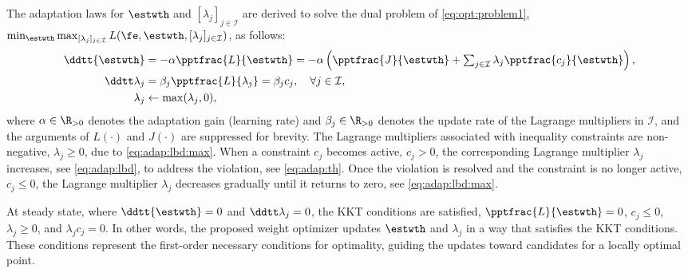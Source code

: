 \documentclass[letterpaper, journal]{IEEEtran}
\newcommand{\ctxt}[2]{\color{#1}#2\color{black}}
\begin{document}
The adaptation laws for $\estwth$ and $[\lambda_j]_{j\in\mathcal I}$ are derived to solve the dual problem of \eqref{eq:opt:problem1}, \ie $\min_{\estwth} \max_{[\lambda_j]_{j\in\mathcal I}}L(\fe,\estwth,[\lambda_j]_{j\in\mathcal I})$, as follows:
\begin{subequations}
    \begin{align}
            \ddtt{\estwth}
            &
            =
            -\alpha \pptfrac{L}{\estwth}
            =
            -\alpha 
            \left(
                \pptfrac{J}{\estwth}
                +
                \textstyle\sum_{j\in\mathcal{I}}
                \lambda_j 
                \pptfrac{c_j}{\estwth}
            \right),
        \label{eq:adap:th}
            \\
            \ddtt\lambda_j
            & 
            = 
            \beta_j\pptfrac{L}{\lambda_j} 
            = 
            \beta_j c_j ,
            \quad \forall j\in\mathcal I,
        \label{eq:adap:lbd}
            \\
            \lambda_j & \leftarrow \max(\lambda_j,0) ,
        \label{eq:adap:lbd:max}
    \end{align}
    \label{eq:adaptation law}%
\end{subequations}
where $\alpha\in\R_{>0}$ denotes the adaptation gain (learning rate) and $\beta_j\in\R_{>0}$ denotes the update rate of the Lagrange multipliers in $\mathcal I$, and the arguments of $L(\cdot)$ and $J(\cdot)$ are suppressed for brevity. 
The Lagrange multipliers associated with inequality constraints are non-negative, \ie $\lambda_j\ge 0$, due to \eqref{eq:adap:lbd:max}. 
When a constraint $c_j$ becomes active, \ie $c_j > 0$, the corresponding Lagrange multiplier $\lambda_j$ increases, see \eqref{eq:adap:lbd}, to address the violation, see \eqref{eq:adap:th}.
Once the violation is resolved and the constraint is no longer active, \ie $c_j \le 0$, the Lagrange multiplier $\lambda_j$ decreases gradually until it returns to zero, see \eqref{eq:adap:lbd:max}.

At steady state, where $\ddtt{\estwth}=0$ and $\ddtt\lambda_j=0$, the KKT conditions are satisfied, \ie $\pptfrac{L}{\estwth}=0$, $c_j \le 0$, $\lambda_j \ge 0$, and $\lambda_j c_j=0$.
In other words, the proposed weight optimizer updates $\estwth$ and $\lambda_j$ in a way that satisfies the KKT conditions. 
These conditions represent the first-order necessary conditions for optimality, guiding the updates toward candidates for a locally optimal point.
\end{document}
